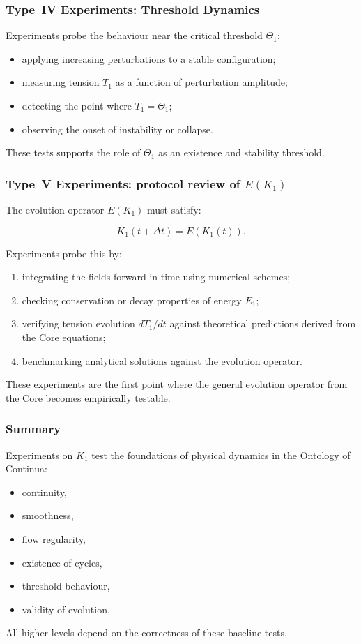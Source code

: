 \subsubsection{Type~IV Experiments: Threshold Dynamics}

Experiments probe the behaviour near the critical threshold $\Theta_1$:

\begin{itemize}
    \item applying increasing perturbations to a stable configuration;
    \item measuring tension $T_1$ as a function of perturbation amplitude;
    \item detecting the point where $T_1 = \Theta_1$;
    \item observing the onset of instability or collapse.
\end{itemize}

These tests supports the role of $\Theta_1$ as an existence and stability
threshold.


\subsubsection{Type~V Experiments: protocol review of \texorpdfstring{$E(K_1)$}{E(K_1)}}

The evolution operator $E(K_1)$ must satisfy:

\[
    K_1(t+\Delta t) = E(K_1(t)).
\]

Experiments probe this by:

\begin{enumerate}
    \item integrating the fields forward in time using numerical schemes;
    \item checking conservation or decay properties of energy $E_1$;
    \item verifying tension evolution $dT_1/dt$ against theoretical
          predictions derived from the Core equations;
    \item benchmarking analytical solutions against the evolution operator.
\end{enumerate}

These experiments are the first point where the general evolution operator
from the Core becomes empirically testable.


\subsubsection{Summary}

Experiments on $K_1$ test the foundations of physical dynamics in the
Ontology of Continua:

\begin{itemize}
    \item continuity,
    \item smoothness,
    \item flow regularity,
    \item existence of cycles,
    \item threshold behaviour,
    \item validity of evolution.
\end{itemize}

All higher levels depend on the correctness of these baseline tests.
